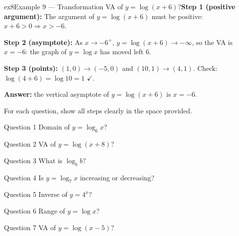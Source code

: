 \documentclass[11pt]{article}
\begin{document}
\begin{example}{ex8}{Example 9 --- Transformation}
VA of $y=\log(x+6)$?\soln \textbf{Step 1 (positive argument):} The argument of $y=\log(x+6)$ must be positive: $x+6>0\Rightarrow x>-6$.

\textbf{Step 2 (asymptote):} As $x\to-6^+$, $y=\log(x+6)\to-\infty$, so the VA is $x=-6$: the graph of $y=\log x$ has moved left $6$.

\textbf{Step 3 (points):} $(1,0)\to(-5,0)$ and $(10,1)\to(4,1)$. Check: $\log(4+6)=\log10=1$ $\checkmark$.

\textbf{Answer:} the vertical asymptote of $y=\log(x+6)$ is $x=-6$.

\end{example}

\clearpage
{}
For each question, show all steps clearly in the space provided.

\begin{qbox}{Question 1}
Domain of $y=\log_6 x$?\workspace{2.4cm}
\end{qbox}

\begin{qbox}{Question 2}
VA of $y=\log(x+8)$?\workspace{2.4cm}
\end{qbox}

\begin{qbox}{Question 3}
What is $\log_b b$?\workspace{2.4cm}
\end{qbox}

\begin{qbox}{Question 4}
Is $y=\log_7 x$ increasing or decreasing?\workspace{2.4cm}
\end{qbox}

\begin{qbox}{Question 5}
Inverse of $y=4^x$?\workspace{2.4cm}
\end{qbox}

\begin{qbox}{Question 6}
Range of $y=\log x$?\workspace{2.4cm}
\end{qbox}

\begin{qbox}{Question 7}
VA of $y=\log(x-5)$?\workspace{2.4cm}
\end{qbox}
\end{document}
